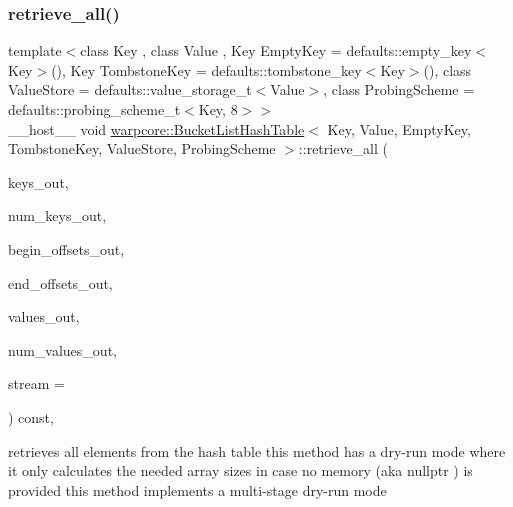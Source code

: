 \subsubsection{\texorpdfstring{retrieve\+\_\+all()}{retrieve\_all()}}
{\footnotesize\ttfamily template$<$class Key , class Value , Key Empty\+Key = defaults\+::empty\+\_\+key$<$\+Key$>$(), Key Tombstone\+Key = defaults\+::tombstone\+\_\+key$<$\+Key$>$(), class Value\+Store  = defaults\+::value\+\_\+storage\+\_\+t$<$\+Value$>$, class Probing\+Scheme  = defaults\+::probing\+\_\+scheme\+\_\+t$<$\+Key, 8$>$$>$ \\
\+\_\+\+\_\+host\+\_\+\+\_\+ void \hyperlink{classwarpcore_1_1BucketListHashTable}{warpcore\+::\+Bucket\+List\+Hash\+Table}$<$ Key, Value, Empty\+Key, Tombstone\+Key, Value\+Store, Probing\+Scheme $>$\+::retrieve\+\_\+all (\begin{DoxyParamCaption}\item[{key\+\_\+type $\ast$const}]{keys\+\_\+out,  }\item[{index\+\_\+type \&}]{num\+\_\+keys\+\_\+out,  }\item[{index\+\_\+type $\ast$const}]{begin\+\_\+offsets\+\_\+out,  }\item[{index\+\_\+type $\ast$const}]{end\+\_\+offsets\+\_\+out,  }\item[{value\+\_\+type $\ast$const}]{values\+\_\+out,  }\item[{value\+\_\+type \&}]{num\+\_\+values\+\_\+out,  }\item[{const cuda\+Stream\+\_\+t}]{stream = {} }\end{DoxyParamCaption}) const\hspace{0.3cm}{\ttfamily [inline]}, {\ttfamily [noexcept]}}



retrieves all elements from the hash table  this method has a dry-\/run mode where it only calculates the needed array sizes in case no memory (aka {\ttfamily nullptr} ) is provided  this method implements a multi-\/stage dry-\/run mode 


